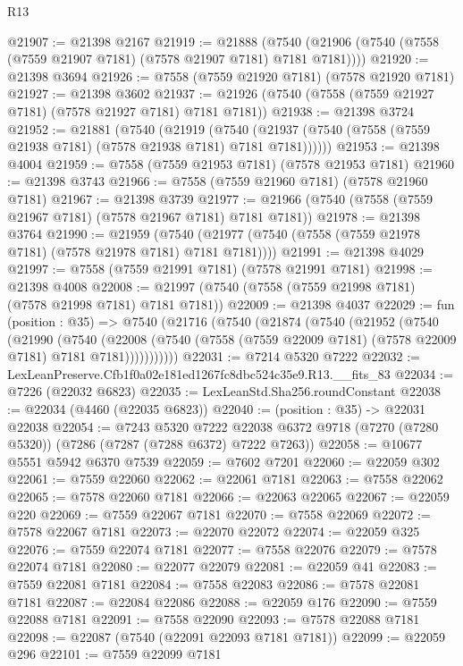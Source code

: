 \begin{lexlean}{R13}
\begin{coremodule}
@21907 := @21398 @2167
@21919 := @21888
    (@7540 (@21906 (@7540 (@7558 (@7559 @21907 @7181) (@7578 @21907 @7181) @7181 @7181))))
@21920 := @21398 @3694
@21926 := @7558 (@7559 @21920 @7181) (@7578 @21920 @7181)
@21927 := @21398 @3602
@21937 := @21926 (@7540 (@7558 (@7559 @21927 @7181) (@7578 @21927 @7181) @7181 @7181))
@21938 := @21398 @3724
@21952 := @21881
    (@7540
      (@21919
        (@7540 (@21937 (@7540 (@7558 (@7559 @21938 @7181) (@7578 @21938 @7181) @7181 @7181))))))
@21953 := @21398 @4004
@21959 := @7558 (@7559 @21953 @7181) (@7578 @21953 @7181)
@21960 := @21398 @3743
@21966 := @7558 (@7559 @21960 @7181) (@7578 @21960 @7181)
@21967 := @21398 @3739
@21977 := @21966 (@7540 (@7558 (@7559 @21967 @7181) (@7578 @21967 @7181) @7181 @7181))
@21978 := @21398 @3764
@21990 := @21959
    (@7540 (@21977 (@7540 (@7558 (@7559 @21978 @7181) (@7578 @21978 @7181) @7181 @7181))))
@21991 := @21398 @4029
@21997 := @7558 (@7559 @21991 @7181) (@7578 @21991 @7181)
@21998 := @21398 @4008
@22008 := @21997 (@7540 (@7558 (@7559 @21998 @7181) (@7578 @21998 @7181) @7181 @7181))
@22009 := @21398 @4037
@22029 := fun (position : @35) =>
  @7540
    (@21716
      (@7540
        (@21874
          (@7540
            (@21952
              (@7540
                (@21990
                  (@7540
                    (@22008
                      (@7540 (@7558 (@7559 @22009 @7181) (@7578 @22009 @7181) @7181 @7181)))))))))))
@22031 := @7214 @5320 @7222
@22032 := LexLeanPreserve.Cfb1f0a02e181ed1267fc8dbc524c35e9.R13.__fits_83
@22034 := @7226 (@22032 @6823)
@22035 := LexLeanStd.Sha256.roundConstant
@22038 := @22034 (@4460 (@22035 @6823))
@22040 := (position : @35) -> @22031 @22038
@22054 := @7243
    @5320
    @7222
    @22038
    @6372
    @9718
    (@7270 (@7280 @5320))
    (@7286 (@7287 (@7288 @6372) @7222 @7263))
@22058 := @10677 @5551 @5942 @6370 @7539
@22059 := @7602 @7201
@22060 := @22059 @302
@22061 := @7559 @22060
@22062 := @22061 @7181
@22063 := @7558 @22062
@22065 := @7578 @22060 @7181
@22066 := @22063 @22065
@22067 := @22059 @220
@22069 := @7559 @22067 @7181
@22070 := @7558 @22069
@22072 := @7578 @22067 @7181
@22073 := @22070 @22072
@22074 := @22059 @325
@22076 := @7559 @22074 @7181
@22077 := @7558 @22076
@22079 := @7578 @22074 @7181
@22080 := @22077 @22079
@22081 := @22059 @41
@22083 := @7559 @22081 @7181
@22084 := @7558 @22083
@22086 := @7578 @22081 @7181
@22087 := @22084 @22086
@22088 := @22059 @176
@22090 := @7559 @22088 @7181
@22091 := @7558 @22090
@22093 := @7578 @22088 @7181
@22098 := @22087 (@7540 (@22091 @22093 @7181 @7181))
@22099 := @22059 @296
@22101 := @7559 @22099 @7181

\end{coremodule}
\end{lexlean}
